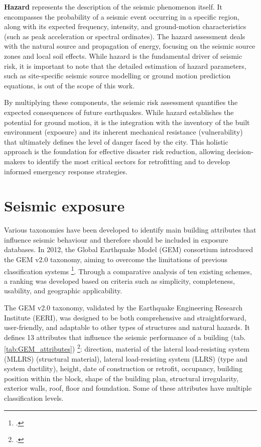 \begin{refsection}
\textbf{Hazard} represents the description of the seismic phenomenon itself. It encompasses the probability of a seismic event occurring in a specific region, along with its expected frequency, intensity, and ground-motion characteristics (such as peak acceleration or spectral ordinates). The hazard assessment deals with the natural source and propagation of energy, focusing on the seismic source zones and local soil effects. While hazard is the fundamental driver of seismic risk, it is important to note that the detailed estimation of hazard parameters, such as site-specific seismic source modelling or ground motion prediction equations, is out of the scope of this work.

By multiplying these components, the seismic risk assessment quantifies the expected consequences of future earthquakes. While hazard establishes the potential for ground motion, it is the integration with the inventory of the built environment (exposure) and its inherent mechanical resistance (vulnerability) that ultimately defines the level of danger faced by the city. This holistic approach is the foundation for effective disaster risk reduction, allowing decision-makers to identify the most critical sectors for retrofitting and to develop informed emergency response strategies.

\renewcommand{\sectionnametext}{Seismic exposure}
\renewcommand{\headingtextR}{\thesection. \sectionnametext}
\section{\sectionnametext}

Various taxonomies have been developed to identify main building attributes that influence seismic behaviour and therefore should be included in exposure databases. In 2012, the Global Earthquake Model (GEM) consortium introduced the GEM v2.0 taxonomy, aiming to overcome the limitations of previous classification systems \footcite{brzev_gem_2013}. Through a comparative analysis of ten existing schemes, a ranking was developed based on criteria such as simplicity, completeness, usability, and geographic applicability.


The GEM v2.0 taxonomy, validated by the Earthquake Engineering Research Institute (EERI), was designed to be both comprehensive and straightforward, user-friendly, and adaptable to other types of structures and natural hazards. It defines 13 attributes that influence the seismic performance of a building (tab. \ref{tab:GEM_attributes}) \footcite{brzev_gem_2013}: direction, material of the lateral load-resisting system (MLLRS) (structural material), lateral load-resisting system (LLRS) (type and system ductility), height, date of construction or retrofit, occupancy, building position within the block, shape of the building plan, structural irregularity, exterior walls, roof, floor and foundation. Some of these attributes have multiple classification levels.



\end{refsection}
